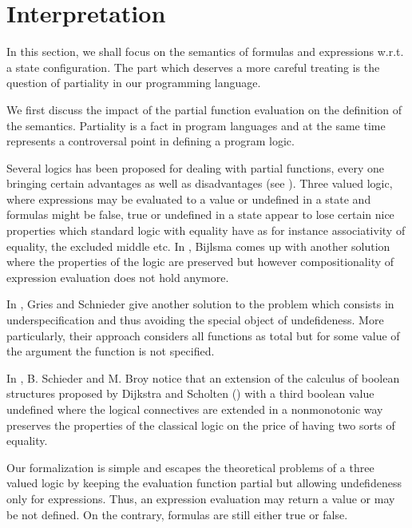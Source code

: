 

\newtheorem{interpExpr}{Definition}[section]
\newtheorem{interpTypeExpr}[interpExpr]{Definition} 
\newtheorem{interpPred}[interpExpr]{Definition}


\section{Interpretation}\label{interpret}

In this section, we shall focus on the semantics of formulas and expressions w.r.t. a state configuration.
The part which deserves a more  careful treating is the question of partiality in our programming language.

We first discuss  the impact of the partial function evaluation on the definition of the semantics. 
Partiality is   a  fact  in program languages and at the same time represents a
 controversal point in defining a program logic. 

 Several logics has been proposed for dealing with partial functions, 
every one bringing certain advantages as well as disadvantages (see \cite{gries95avoiding,schieder99adapting}).
Three valued logic, where expressions may be evaluated to a value or  undefined  in a state and
 formulas might be false, true or undefined in a state appear to lose certain nice properties
 which standard logic with equality have
as for instance associativity of equality, the excluded middle \cite{gries95avoiding} etc.
 In \cite{bijlsma90sqb}, Bijlsma comes up with another solution where the  properties of the logic are preserved but 
however compositionality of expression evaluation does not hold anymore.

In \cite{gries95avoiding}, Gries and Schnieder give another solution to the problem which consists in underspecification 
and thus  avoiding the special object of undefideness.
 More particularly, their approach considers all functions as total but for some value of the argument 
the function is not specified. 

In \cite{schieder99adapting},  B. Schieder and M. Broy notice that 
  an extension  of the calculus of boolean structures proposed by Dijkstra and Scholten (\cite{WPCDS}) with a  third boolean value 
undefined where  the logical connectives are extended in a nonmonotonic way preserves the properties of the classical logic
on the price  of having two sorts of equality. 

Our formalization is simple and escapes the theoretical problems of a three valued logic by keeping the evaluation function partial but
 allowing undefideness only for expressions.
Thus, an expression evaluation may return a value or may  be not defined. On the contrary, formulas are still either true or false.   


